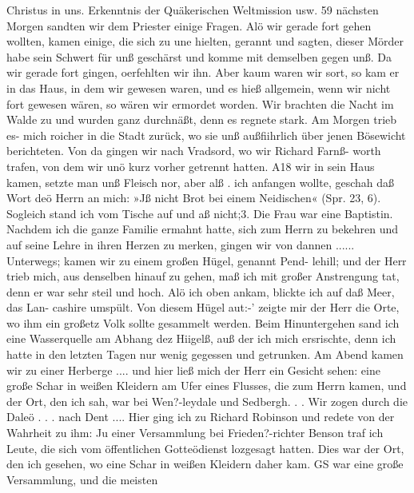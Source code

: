Christus in uns. Erkenntnis der Quäkerischen Weltmission usw. 59
nächsten Morgen sandten wir dem Priester einige Fragen. Alö
wir gerade fort gehen wollten, kamen einige, die sich zu une
hielten, gerannt und sagten, dieser Mörder habe sein Schwert
für unß geschärst und komme mit demselben gegen unß. Da wir
gerade fort gingen, oerfehlten wir ihn. Aber kaum waren wir
sort, so kam er in das Haus, in dem wir gewesen waren, und
es hieß allgemein, wenn wir nicht fort gewesen wären, so wären
wir ermordet worden. Wir brachten die Nacht im Walde zu
und wurden ganz durchnäßt, denn es regnete stark. Am Morgen
trieb es- mich roicher in die Stadt zurück, wo sie unß außfiihrlich
über jenen Bösewicht berichteten.
Von da gingen wir nach Vradsord, wo wir Richard Farnß-
worth trafen, von dem wir unö kurz vorher getrennt hatten.
A18 wir in sein Haus kamen, setzte man unß Fleisch nor, aber alß
. ich anfangen wollte, geschah daß Wort deö Herrn an mich: »Jß nicht
Brot bei einem Neidischen« (Spr. 23, 6). Sogleich stand ich
vom Tische auf und aß nicht;3. Die Frau war eine Baptistin.
Nachdem ich die ganze Familie ermahnt hatte, sich zum Herrn
zu bekehren und auf seine Lehre in ihren Herzen zu merken,
gingen wir von dannen ......
Unterwegs; kamen wir zu einem großen Hügel, genannt Pend-
lehill; und der Herr trieb mich, aus denselben hinauf zu gehen,
maß ich mit großer Anstrengung tat, denn er war sehr steil und
hoch. Alö ich oben ankam, blickte ich auf daß Meer, das Lan-
cashire umspült. Von diesem Hügel aut:-’ zeigte mir der Herr
die Orte, wo ihm ein großetz Volk sollte gesammelt werden.
Beim Hinuntergehen sand ich eine Wasserquelle am Abhang
dez Hiigelß, auß der ich mich ersrischte, denn ich hatte in den
letzten Tagen nur wenig gegessen und getrunken. Am Abend
kamen wir zu einer Herberge .... und hier ließ mich der
Herr ein Gesicht sehen: eine große Schar in weißen Kleidern
am Ufer eines Flusses, die zum Herrn kamen, und der Ort, den
ich sah, war bei Wen?-leydale und Sedbergh. . .
Wir zogen durch die Daleö . . . nach Dent .... Hier ging
ich zu Richard Robinson und redete von der Wahrheit zu ihm:
Ju einer Versammlung bei Frieden?-richter Benson traf ich Leute,
die sich vom öffentlichen Gotteödienst lozgesagt hatten. Dies
war der Ort, den ich gesehen, wo eine Schar in weißen Kleidern
daher kam. GS war eine große Versammlung, und die meisten

